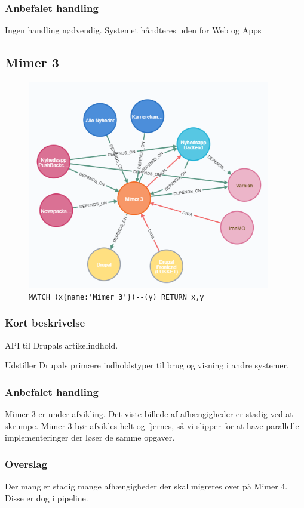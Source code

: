 \documentclass{article}
\begin{document}
\subsubsection*{Anbefalet handling}
Ingen handling nødvendig. Systemet håndteres uden for Web og Apps



\subsection{Mimer 3}
\begin{figure}[H]
\includegraphics[width=300pt]{Mimer3.PNG}
\cprotect\caption{\verb|MATCH (x{name:'Mimer 3'})--(y) RETURN x,y|}
\end{figure}
\subsubsection*{Kort beskrivelse}
API til Drupals artikelindhold.

Udstiller Drupals primære indholdstyper til brug og visning i andre systemer.
\subsubsection*{Anbefalet handling}
Mimer 3 er under afvikling. Det viste billede af afhængigheder er stadig ved at skrumpe. Mimer 3 bør afvikles helt og fjernes, så vi slipper for at have parallelle implementeringer der løser de samme opgaver.
\subsubsection*{Overslag}
Der mangler stadig mange afhængigheder der skal migreres over på Mimer 4. Disse er dog i pipeline.
\end{document}

